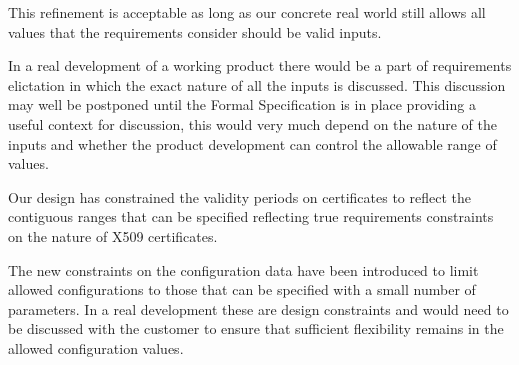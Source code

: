 This refinement is acceptable as long as our concrete real world still
allows all values that the requirements consider should be valid
inputs.

In a real development of a working product there would be a part 
of requirements elictation in which the exact nature of all the inputs is
discussed. This discussion may well be postponed until the Formal
Specification is in place providing a useful context for
discussion, this would very much depend on the nature of the inputs
and whether the product development can control the allowable range of values. 

Our design has constrained the validity periods on certificates to
reflect the contiguous ranges that can be specified reflecting true
requirements constraints on the nature of X509 certificates.

The new constraints on the configuration data have been introduced to
limit allowed configurations to those that can be specified with a
small number of parameters. In a real development these are design
constraints and would need to be discussed with the customer to ensure
that sufficient flexibility remains in the allowed configuration values.
 


